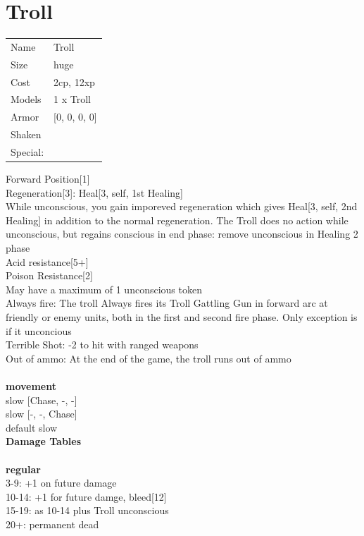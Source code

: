 \clearpage

\section{ Troll }

\begin{tabular}{ll}
  Name & Troll \\
  Size & huge\\
  Cost & 2cp, 12xp\\
  Models & 1 x Troll\\
  Armor & [0, 0, 0, 0]\\
  Shaken & \\
  Special: \\
\end{tabular}

\noindent Forward Position[1]\\ 
Regeneration[3]: Heal[3, self, 1st Healing]\\ 
While unconscious, you gain imporeved regeneration which gives Heal[3, self, 2nd Healing] in addition to the normal regeneration. The Troll does no action while unconscious, but regains conscious in end phase: remove unconscious in Healing 2 phase\\ 
Acid resistance[5+]\\ 
Poison Resistance[2]\\ 
May have a maximum of 1 unconscious token\\ 
Always fire: The troll Always fires its Troll Gattling Gun in forward arc at friendly or enemy units, both in the first and second fire phase. Only exception is if it unconcious\\ 
Terrible Shot: -2 to hit with ranged weapons\\ 
Out of ammo: At the end of the game, the troll runs out of ammo\\ 


\ \\ {\bf movement } \\
slow [Chase, -, -] \\
slow [-, -, Chase] \\
default slow \\


{\bf Damage Tables} \\
\ \\ {\bf regular } \\
3-9: +1 on future damage \\
10-14: +1 for future damge, bleed[12] \\
15-19: as 10-14 plus Troll unconscious \\
20+: permanent dead \\


